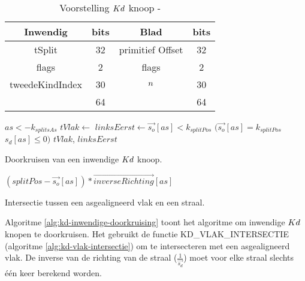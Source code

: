 \begin{table}
    \centering
    \begin{tabular}{@{}|c|c|c|c|@{}} \toprule      
    Inwendig & bits & Blad & bits \\ \midrule
    tSplit & 32 & primitief Offset & 32 \\
    flags  & 2  &  flags   & 2    \\
    tweedeKindIndex & 30 & $n$ & 30 \\ \hline \hline
    & 64 & & 64    \\ \bottomrule
    \end{tabular}
    \caption[Voorstelling $\symKd$ knoop]{Voorstelling $\symKd$ knoop - \small }
    \label{tab:voorstelling-kd-knoop}
\end{table}            
\begin{dutchalgorithm}
    \begin{algorithmic}       
            \State $as <- k_{splitsAs}$
            \State $tVlak \gets $ 
            \State $linksEerst \gets \vec{s_o}[as] < k_{splitPos}$ \Or $(\vec{s_o}[as] = k_{splitPos}$ \And $s_d[as] \leq 0)$
            \State \Return $tVlak$, $linksEerst$
        \EndFunction
    \end{algorithmic}
    \caption{Doorkruisen van een inwendige $\symKd$ knoop.}
    \label{alg:kd-inwendige-doorkruising}
\end{dutchalgorithm}
\begin{dutchalgorithm}
    \begin{algorithmic}       
            \State \Return $(splitPos - \vec{s_o}[as]) * \vec{inverseRichting}[as]$
        \EndFunction
    \end{algorithmic}
    \caption{Intersectie tussen een asgealigneerd vlak en een straal.}
    \label{alg:kd-vlak-intersectie}
\end{dutchalgorithm}
Algoritme \ref{alg:kd-inwendige-doorkruising} toont het algoritme om inwendige $\symKd$ knopen te doorkruisen.
Het gebruikt de functie KD\_VLAK\_INTERSECTIE (algoritme \ref{alg:kd-vlak-intersectie}) om te intersecteren met een asgealigneerd vlak.
De inverse van de richting van de straal ($\frac{1}{\vec{s_d}}$) moet voor elke straal slechts één keer berekend worden.

